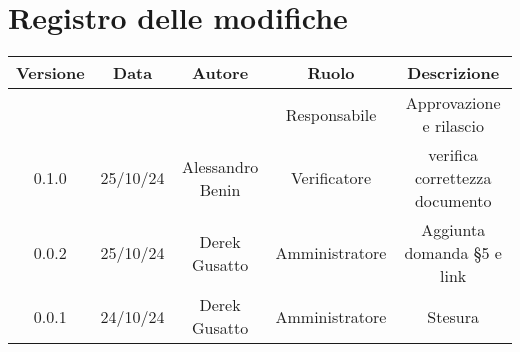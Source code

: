 
\section*{Registro delle modifiche}
\begin{table}[H]
    \begin{tabular}{|c|c|c|c|c|}
        \hline
         \textbf{Versione} &  \textbf{Data} &  \textbf{Autore} &  \textbf{Ruolo} & \textbf{Descrizione} \\
          \hline
          &  &  & Responsabile & Approvazione e rilascio\\
          \hline
          0.1.0& 25/10/24 & Alessandro Benin  & Verificatore  & verifica correttezza documento  \\
          \hline
          0.0.2& 25/10/24 & Derek Gusatto & Amministratore & Aggiunta domanda §5 e link  \\
          \hline
          0.0.1& 24/10/24 & Derek Gusatto & Amministratore & Stesura \\
          \hline
    \end{tabular}
\end{table}